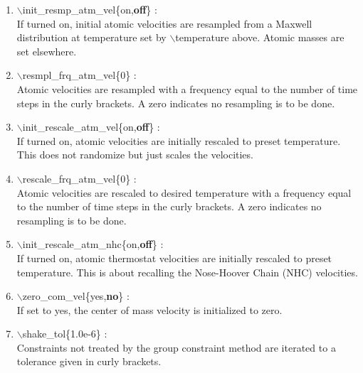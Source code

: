 \documentclass[12pt,titlepage]{article}
\begin{document}
\begin{enumerate}
 \vspace{0.15in}
 \item   $\backslash$init\_resmp\_atm\_vel\{on,{\bf off}\} : \\
     If turned on, initial atomic velocities are resampled from a 
     Maxwell distribution at temperature set by $\backslash$temperature above.
     Atomic masses are set elsewhere.

 \vspace{0.15in}
 \item   $\backslash$resmpl\_frq\_atm\_vel\{0\} : \\
     Atomic velocities are resampled with a frequency equal to the number of time steps
     in the curly brackets.  A zero indicates no resampling is to be done.


 \vspace{0.15in}
 \item   $\backslash$init\_rescale\_atm\_vel\{on,{\bf off}\} : \\
    If turned on, atomic velocities are initially rescaled to preset 
    temperature.   This does not randomize but just scales the velocities.

 \vspace{0.15in}
 \item   $\backslash$rescale\_frq\_atm\_vel\{0\} : \\
    Atomic velocities are rescaled to desired temperature
    with a frequency equal to the number of time steps in the
    curly brackets.  A zero indicates no resampling is to be done.

 \vspace{0.15in} 
 \item   $\backslash$init\_rescale\_atm\_nhc\{on,{\bf off}\} : \\
    If turned on, atomic thermostat velocities are initially rescaled to 
    preset temperature.  This is about recalling the Nose-Hoover Chain (NHC) velocities.

 \vspace{0.15in} 
 \item   $\backslash$zero\_com\_vel\{yes,{\bf no}\} : \\
    If set to yes, the center of mass velocity is initialized to zero.

 \vspace{0.15in} 
 \item   $\backslash$shake\_tol\{1.0e-6\} : \\
     Constraints not treated by the group constraint method are iterated to a
     tolerance given in curly brackets.



\end{enumerate}
\end{document}
